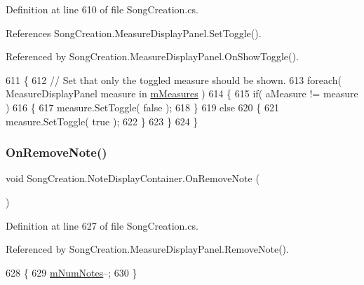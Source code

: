 Definition at line 610 of file Song\+Creation.\+cs.



References Song\+Creation.\+Measure\+Display\+Panel.\+Set\+Toggle().



Referenced by Song\+Creation.\+Measure\+Display\+Panel.\+On\+Show\+Toggle().


\begin{DoxyCode}
611         \{
612             \textcolor{comment}{// Set that only the toggled measure should be shown.}
613             \textcolor{keywordflow}{foreach}( MeasureDisplayPanel measure \textcolor{keywordflow}{in} \hyperlink{class_song_creation_1_1_note_display_container_a19c1c32db579c642fbc1b5bce0c80e7a}{mMeasures} )
614             \{
615                 \textcolor{keywordflow}{if}( aMeasure != measure )
616                 \{
617                     measure.SetToggle( \textcolor{keyword}{false} );
618                 \}
619                 \textcolor{keywordflow}{else}
620                 \{
621                     measure.SetToggle( \textcolor{keyword}{true} );
622                 \}
623             \}
624         \}
\end{DoxyCode}
\mbox{\label{class_song_creation_1_1_note_display_container_a5ab7823feaccccfd9c886c7210819640}} 
\subsubsection{\texorpdfstring{On\+Remove\+Note()}{OnRemoveNote()}}
{\footnotesize\ttfamily void Song\+Creation.\+Note\+Display\+Container.\+On\+Remove\+Note (\begin{DoxyParamCaption}{ }\end{DoxyParamCaption})}



Definition at line 627 of file Song\+Creation.\+cs.



Referenced by Song\+Creation.\+Measure\+Display\+Panel.\+Remove\+Note().


\begin{DoxyCode}
628         \{
629             \hyperlink{class_song_creation_1_1_note_display_container_a5ce614dc2b8f3d41f885639a92c97b1b}{mNumNotes}--;
630         \}
\end{DoxyCode}


